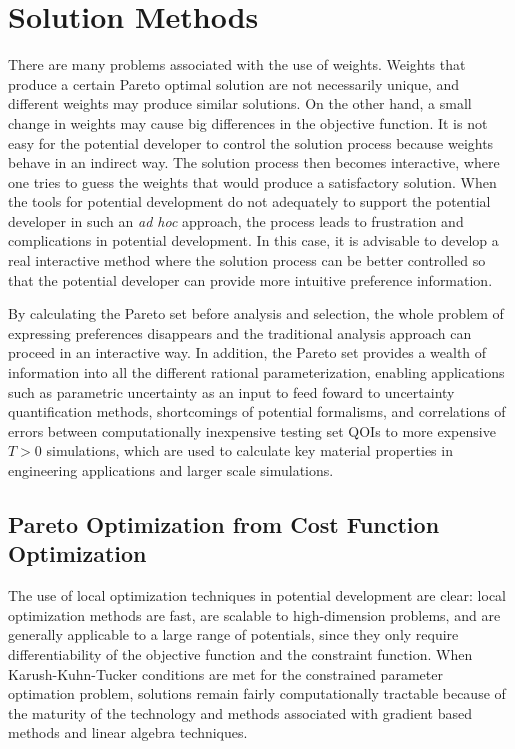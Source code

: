 \section{Solution Methods}
There are many problems associated with the use of weights.  Weights that produce a certain Pareto optimal solution are not necessarily unique, and different weights may produce similar solutions.  On the other hand, a small change in weights may cause big differences in the objective function.  It is not easy for the potential developer to control the solution process because weights behave in an indirect way.  The solution process then becomes interactive, where one tries to guess the weights that would produce a satisfactory solution.  When the tools for potential development do not adequately to support the potential developer in such an \emph{ad hoc} approach, the process leads to frustration and complications in potential development.  In this case, it is advisable to develop a real interactive method where the solution process can be better controlled so that the potential developer can provide more intuitive preference information.

By calculating the Pareto set before analysis and selection, the whole problem of expressing preferences disappears and the traditional analysis approach can proceed in an interactive way.  In addition, the Pareto set provides a wealth of information into all the different rational parameterization, enabling applications such as parametric uncertainty as an input to feed foward to uncertainty quantification methods, shortcomings of potential formalisms, and correlations of errors between computationally inexpensive testing set QOIs to more expensive $T>0$ simulations, which are used to calculate key material properties in engineering applications and larger scale simulations.

\subsection{Pareto Optimization from Cost Function Optimization}
\label{sec:pareto_w_cost_function}

The use of local optimization techniques in potential development are clear: local optimization methods are fast, are scalable to high-dimension problems, and are generally applicable to a large range of potentials, since they only require differentiability of the objective function and the constraint function\cite{boyd_convex_optimization}.  When Karush-Kuhn-Tucker conditions\cite{karush1939_kkt,kuhn1951_kkt} are met for the constrained parameter optimation problem, solutions remain fairly computationally tractable because of the maturity of the technology and methods associated with gradient based methods and linear algebra techniques.

